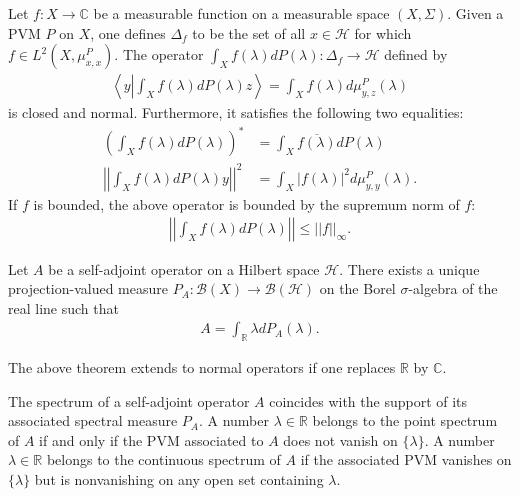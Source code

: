     \begin{property}
        Let $f:X\rightarrow\mathbb{C}$ be a measurable function on a measurable space $(X,\Sigma)$. Given a PVM $P$ on $X$, one defines $\Delta_f$ to be the set of all $x\in\mathcal{H}$ for which $f\in L^2(X, \mu^P_{x,x})$. The operator $\int_Xf(\lambda)dP(\lambda):\Delta_f\rightarrow\mathcal{H}$ defined by
        \begin{gather}
            \left\langle y\left|\int_Xf(\lambda)dP(\lambda)z\right.\right\rangle = \int_Xf(\lambda)d\mu^P_{y,z}(\lambda)
        \end{gather}
        is closed and normal. Furthermore, it satisfies the following two equalities:
        \begin{align}
            \left(\int_Xf(\lambda)dP(\lambda)\right)^* &= \int_X\overline{f(\lambda)}dP(\lambda)\\
            \left|\left|\int_Xf(\lambda)dP(\lambda)y\right|\right|^2 &= \int_X|f(\lambda)|^2d\mu^P_{y,y}(\lambda).
        \end{align}
        If $f$ is bounded, the above operator is bounded by the supremum norm of $f$:
        \begin{gather}
            \left|\left|\int_Xf(\lambda)dP(\lambda)\right|\right|\leq||f||_\infty.
        \end{gather}
    \end{property}

    \begin{theorem}
        Let $A$ be a self-adjoint operator on a Hilbert space $\mathcal{H}$. There exists a unique projection-valued measure $P_A:\mathcal{B}(X)\rightarrow\mathcal{B}(\mathcal{H})$ on the Borel $\sigma$-algebra of the real line such that
        \begin{gather}
            A = \int_{\mathbb{R}}\lambda dP_A(\lambda).
        \end{gather}
    \end{theorem}
    \begin{remark}
        The above theorem extends to normal operators if one replaces $\mathbb{R}$ by $\mathbb{C}$.
    \end{remark}
    \begin{property}
        The spectrum of a self-adjoint operator $A$ coincides with the support of its associated spectral measure $P_A$. A number $\lambda\in\mathbb{R}$ belongs to the point spectrum of $A$ if and only if the PVM associated to $A$ does not vanish on $\{\lambda\}$. A number $\lambda\in\mathbb{R}$ belongs to the continuous spectrum of $A$ if the associated PVM vanishes on $\{\lambda\}$ but is nonvanishing on any open set containing $\lambda$.
    \end{property}

